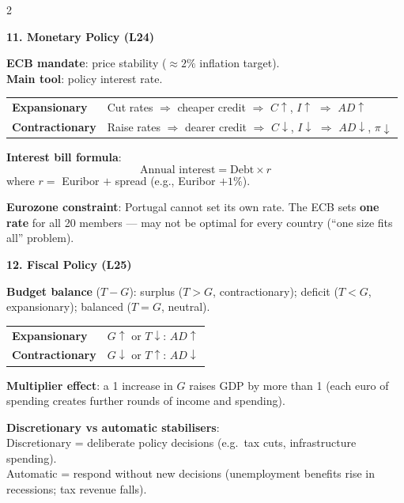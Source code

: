 \documentclass[9pt]{article}
\newcommand{\euro}{\EURdig}
\begin{document}
\begin{multicols}{2}
\columnbreak

\begin{greenbox}
\textbf{\color{macro_green}11. Monetary Policy (L24)}

\smallskip
\textbf{ECB mandate}: price stability ($\approx 2\%$ inflation target).\\[2pt]
\textbf{Main tool}: policy interest rate.\\[2pt]

\begin{tabular}{@{}p{2.8cm}p{4cm}@{}}
\textbf{Expansionary} & Cut rates $\Rightarrow$ cheaper credit $\Rightarrow$ $C\uparrow$, $I\uparrow$ $\Rightarrow$ $AD\uparrow$ \\[3pt]
\textbf{Contractionary} & Raise rates $\Rightarrow$ dearer credit $\Rightarrow$ $C\downarrow$, $I\downarrow$ $\Rightarrow$ $AD\downarrow$, $\pi\downarrow$ \\[3pt]
\end{tabular}

\smallskip
\textbf{Interest bill formula}:
\[
  \text{Annual interest} = \text{Debt} \times r
\]
where $r = $ Euribor $+$ spread (e.g., Euribor $+1\%$).

\smallskip
\textbf{Eurozone constraint}: Portugal cannot set its own rate.
The ECB sets \textbf{one rate} for all 20 members --- may not be optimal for every country
(``one size fits all'' problem).
\end{greenbox}

\begin{greenbox}
\textbf{\color{macro_green}12. Fiscal Policy (L25)}

\smallskip
\textbf{Budget balance} ($T - G$): surplus ($T>G$, contractionary); deficit ($T<G$, expansionary); balanced ($T=G$, neutral).

\smallskip
\begin{tabular}{@{}ll@{}}
\textbf{Expansionary} & $G{\uparrow}$ or $T{\downarrow}$: $AD{\uparrow}$ \\[3pt]
\textbf{Contractionary} & $G{\downarrow}$ or $T{\uparrow}$: $AD{\downarrow}$ \\[3pt]
\end{tabular}

\smallskip
\textbf{Multiplier effect}: a \euro{}1 increase in $G$ raises GDP by more than \euro{}1 (each euro of spending creates further rounds of income and spending).

\smallskip
\textbf{Discretionary vs automatic stabilisers}:\\
Discretionary = deliberate policy decisions (e.g.\ tax cuts, infrastructure spending).\\
Automatic = respond without new decisions (unemployment benefits rise in recessions; tax revenue falls).


\end{greenbox}
\end{multicols}
\end{document}
